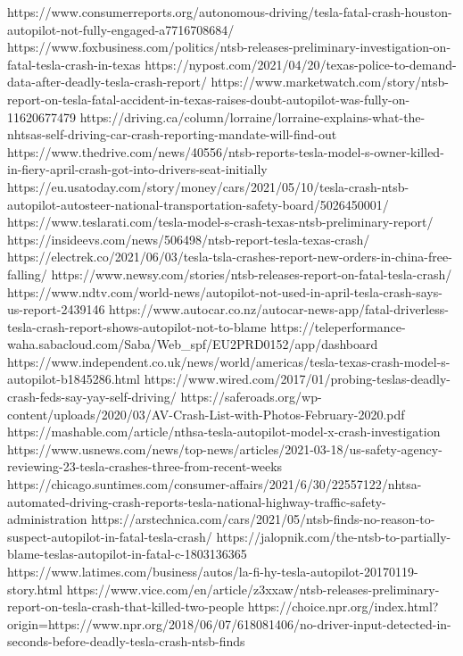 https://www.consumerreports.org/autonomous-driving/tesla-fatal-crash-houston-autopilot-not-fully-engaged-a7716708684/
https://www.foxbusiness.com/politics/ntsb-releases-preliminary-investigation-on-fatal-tesla-crash-in-texas
https://nypost.com/2021/04/20/texas-police-to-demand-data-after-deadly-tesla-crash-report/
https://www.marketwatch.com/story/ntsb-report-on-tesla-fatal-accident-in-texas-raises-doubt-autopilot-was-fully-on-11620677479
https://driving.ca/column/lorraine/lorraine-explains-what-the-nhtsas-self-driving-car-crash-reporting-mandate-will-find-out
https://www.thedrive.com/news/40556/ntsb-reports-tesla-model-s-owner-killed-in-fiery-april-crash-got-into-drivers-seat-initially
https://eu.usatoday.com/story/money/cars/2021/05/10/tesla-crash-ntsb-autopilot-autosteer-national-transportation-safety-board/5026450001/
https://www.teslarati.com/tesla-model-s-crash-texas-ntsb-preliminary-report/
https://insideevs.com/news/506498/ntsb-report-tesla-texas-crash/
https://electrek.co/2021/06/03/tesla-tsla-crashes-report-new-orders-in-china-free-falling/
https://www.newsy.com/stories/ntsb-releases-report-on-fatal-tesla-crash/
https://www.ndtv.com/world-news/autopilot-not-used-in-april-tesla-crash-says-us-report-2439146
https://www.autocar.co.nz/autocar-news-app/fatal-driverless-tesla-crash-report-shows-autopilot-not-to-blame
https://teleperformance-waha.sabacloud.com/Saba/Web_spf/EU2PRD0152/app/dashboard
https://www.independent.co.uk/news/world/americas/tesla-texas-crash-model-s-autopilot-b1845286.html
https://www.wired.com/2017/01/probing-teslas-deadly-crash-feds-say-yay-self-driving/
https://saferoads.org/wp-content/uploads/2020/03/AV-Crash-List-with-Photos-February-2020.pdf
https://mashable.com/article/nthsa-tesla-autopilot-model-x-crash-investigation
https://www.usnews.com/news/top-news/articles/2021-03-18/us-safety-agency-reviewing-23-tesla-crashes-three-from-recent-weeks
https://chicago.suntimes.com/consumer-affairs/2021/6/30/22557122/nhtsa-automated-driving-crash-reports-tesla-national-highway-traffic-safety-administration
https://arstechnica.com/cars/2021/05/ntsb-finds-no-reason-to-suspect-autopilot-in-fatal-tesla-crash/
https://jalopnik.com/the-ntsb-to-partially-blame-teslas-autopilot-in-fatal-c-1803136365
https://www.latimes.com/business/autos/la-fi-hy-tesla-autopilot-20170119-story.html
https://www.vice.com/en/article/z3xxaw/ntsb-releases-preliminary-report-on-tesla-crash-that-killed-two-people
https://choice.npr.org/index.html?origin=https://www.npr.org/2018/06/07/618081406/no-driver-input-detected-in-seconds-before-deadly-tesla-crash-ntsb-finds
